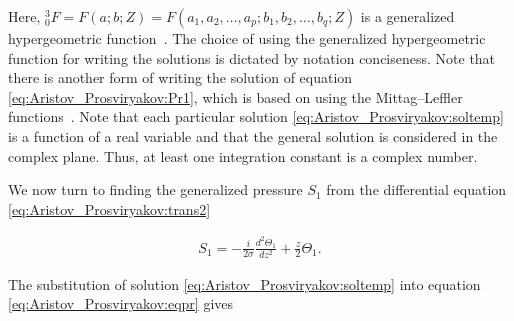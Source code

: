 Here,  ${^{3}_{0}F}=F\left(a; b; Z\right)=F\left(a_1, a_2, \ldots, a_p; b_1, b_2, \ldots, b_q; Z\right)$ is a generalized hypergeometric function~\cite{ulg:bib:Polyanin}. The choice of using the generalized hypergeometric function for writing the solutions is dictated by notation conciseness. Note that there is another form of writing the solution of equation \eqref{eq:Aristov_Prosviryakov:Pr1}, which is based on using the Mittag--Leffler functions~\cite{ulg:bib:Polyanin}. Note that each particular solution \eqref{eq:Aristov_Prosviryakov:soltemp} is a function of a real variable and that the general solution is considered in the complex plane. Thus, at least one integration constant is a complex number.



We now turn to finding the generalized pressure $S_1$  from the differential equation \eqref{eq:Aristov_Prosviryakov:trans2} 

 \begin{gather}

       \label{eq:Aristov_Prosviryakov:eqpr}

S_1=-\frac{i}{2\sigma}\frac{d^2 \Theta_1}{d z^2}+\frac{z}{2}\Theta_1.

\end{gather}



The substitution of solution \eqref{eq:Aristov_Prosviryakov:soltemp} into equation \eqref{eq:Aristov_Prosviryakov:eqpr} gives

